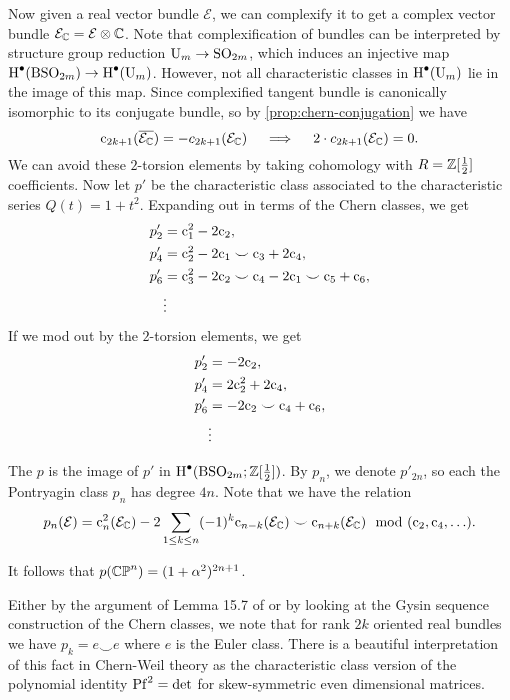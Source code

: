 Now given a real vector bundle $\mathcal{E}$, we can complexify it to get a complex vector bundle $\mathcal{E}_{\mathbb{C}} = \mathcal{E}\otimes \mathbb{C}$. 
Note that complexification of bundles can be interpreted by structure group reduction $\mathrm{U}_m \to \mathrm{SO}_{2m}$, which induces an injective map $\operatorname{H}^\bullet(\mathrm{BSO}_{2m})\to \operatorname{H}^\bullet(\mathrm{U}_m)$. However, not all characteristic classes in $\operatorname{H}^\bullet(\mathrm{U}_m)$ lie in the image of this map. 
Since complexified tangent bundle is canonically isomorphic to its conjugate bundle, so by \cref{prop:chern-conjugation} we have
\[
	\mathrm{c}_{2k+1}(\overline{\mathcal{E}_{\mathbb{C}}}) = -c_{2k+1}(\mathcal{E}_{\mathbb{C}}) \quad\implies\quad 2\cdot c_{2k+1}(\mathcal{E}_{\mathbb{C}}) = 0.
\]
We can avoid these $2$-torsion elements by taking cohomology with $R=\mathbb{Z}[\frac{1}{2}]$ coefficients. Now let $p'$ be the characteristic class associated to the characteristic series $Q(t)=1+t^2$. Expanding out in terms of the Chern classes, we get
\[
	\begin{aligned}
		p'_2 &= \mathrm{c}_1^2 - 2\mathrm{c}_2,\\
		p'_4 &= \mathrm{c}_2^2 - 2\mathrm{c}_1\smile \mathrm{c}_3 + 2\mathrm{c}_4,\\
		p'_6 &= \mathrm{c}_3^2 - 2\mathrm{c}_2\smile \mathrm{c}_4 - 2\mathrm{c}_1\smile \mathrm{c}_5 + \mathrm{c}_6,\\
				 &\vdots
	\end{aligned}
\]
If we mod out by the $2$-torsion elements, we get
\[
	\begin{aligned}
		p'_2 &= -2\mathrm{c}_2,\\
		p'_4 &= 2\mathrm{c}_2^2+2\mathrm{c}_4,\\
		p'_6 &= -2 \mathrm{c}_2\smile \mathrm{c}_4 + \mathrm{c}_6,\\
				 &\vdots
	\end{aligned}
\]

\begin{definition}
	The  $p$ is the image of $p'$ in $\operatorname{H}^\bullet(\mathrm{BSO}_{2m}; \mathbb{Z}[\frac{1}{2}])$. By $p_n$, we denote $p'_{2n}$, so each the Pontryagin class $p_n$ has degree $4n$. Note that we have the relation
	\[
		p_n(\mathcal{E}) =\mathrm{c}_n^2(\mathcal{E}_{\mathbb{C}}) - 2\sum_{1\leq k\leq n}(-1)^k\mathrm{c}_{n-k}(\mathcal{E}_{\mathbb{C}})\smile \mathrm{c}_{n+k}(\mathcal{E}_{\mathbb{C}})\mod (\mathrm{c}_{2}, \mathrm{c}_4, \ldots).
	\]
\end{definition}

\begin{example}
	It follows that $p(\mathbb{CP}^n) = (1+\alpha^2)^{2n+1}$.
\end{example}

\begin{remark}
	Either by the argument of Lemma 15.7 of \cite{milnorstasheff1974} or by looking at the Gysin sequence construction of the Chern classes, we note that for rank $2k$ oriented real bundles we have $p_k = e\smile e$ where $e$ is the Euler class. There is a beautiful interpretation of this fact in Chern-Weil theory as the characteristic class version of the polynomial identity $\operatorname{Pf}^2 = \det$ for skew-symmetric even dimensional matrices.
\end{remark}

